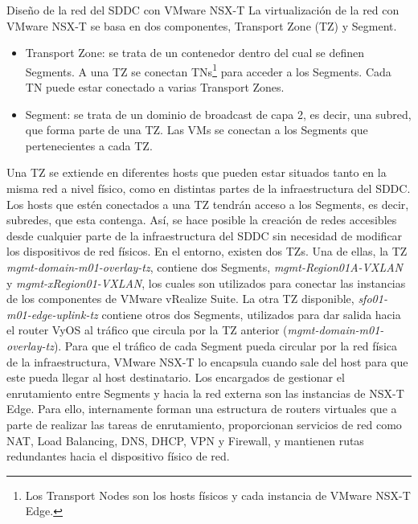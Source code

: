 \begin{subsubsection}{Diseño de la red del SDDC con VMware NSX-T}
    La virtualización de la red con VMware NSX-T se basa en dos componentes, Transport Zone (TZ) y Segment.
    \begin{itemize}
        \item Transport Zone: se trata de un contenedor dentro del cual se definen Segments. A una TZ se conectan TNs\footnote{Los Transport Nodes son los hosts físicos y cada instancia de VMware NSX-T Edge.} para acceder a los Segments. Cada TN puede estar conectado a varias Transport Zones.
        \item Segment: se trata de un dominio de broadcast de capa 2, es decir, una subred, que forma parte de una TZ. Las VMs se conectan a los Segments que pertenecientes a cada TZ.
    \end{itemize}
    Una TZ se extiende en diferentes hosts que pueden estar situados tanto en la misma red a nivel físico, como en distintas partes de la infraestructura del SDDC. Los hosts que estén conectados a una TZ tendrán acceso a los Segments, es decir, subredes, que esta contenga. Así, se hace posible la creación de redes accesibles desde cualquier parte de la infraestructura del SDDC sin necesidad de modificar los dispositivos de red físicos.
    En el entorno, existen dos TZs. Una de ellas, la TZ \textit{mgmt-domain-m01-overlay-tz}, contiene dos Segments, \textit{mgmt-Region01A-VXLAN} y \textit{mgmt-xRegion01-VXLAN}, los cuales son utilizados para conectar las instancias de los componentes de VMware vRealize Suite. La otra TZ disponible, \textit{sfo01-m01-edge-uplink-tz} contiene otros dos Segments, utilizados para dar salida hacia el router VyOS al tráfico que circula por la TZ anterior (\textit{mgmt-domain-m01-overlay-tz}). Para que el tráfico de cada Segment pueda circular por la red física de la infraestructura, VMware NSX-T lo encapsula cuando sale del host para que este pueda llegar al host destinatario.
    Los encargados de gestionar el enrutamiento entre Segments y hacia la red externa son las instancias de NSX-T Edge. Para ello, internamente forman una estructura de routers virtuales que a parte de realizar las tareas de enrutamiento, proporcionan servicios de red como NAT, Load Balancing, DNS, DHCP, VPN y Firewall, y mantienen rutas redundantes hacia el dispositivo físico de red.
    \begin{figure}[h]
        \centering

\end{figure}
\end{subsubsection}
